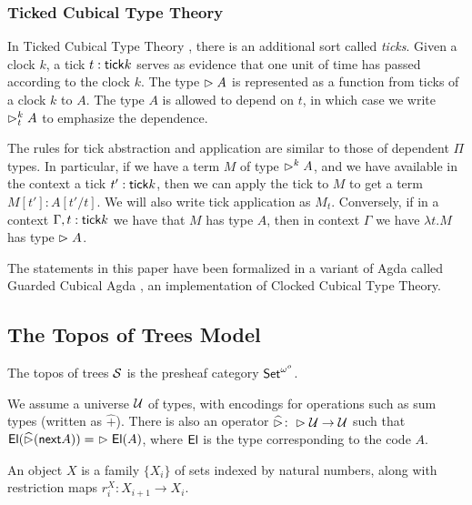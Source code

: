 \documentclass[acmsmall,screen]{acmart}
\begin{document}
\subsubsection{Ticked Cubical Type Theory}

In Ticked Cubical Type Theory \cite{TODO}, there is an additional sort
called \emph{ticks}. Given a clock $k$, a tick $t : \mathsf{tick} k$ serves
as evidence that one unit of time has passed according to the clock $k$.
The type $\vartriangleright A$ is represented as a function from ticks of a clock $k$ to $A$.
The type $A$ is allowed to depend on $t$, in which case we write $\vartriangleright^k_t A$
to emphasize the dependence.


The rules for tick abstraction and application are similar to those of dependent
$\Pi$ types. 
In particular, if we have a term $M$ of type $\vartriangleright^k A$, and we
have available in the context a tick $t' : \mathsf{tick} k$, then we can apply the tick to $M$ to get
a term $M[t'] : A[t'/t]$. We will also write tick application as $M_t$.
Conversely, if in a context $\Gamma, t : \mathsf{tick} k$ we have that $M$ has type $A$,
then in context $\Gamma$ we have $\lambda t.M$ has type $\vartriangleright A$. %

The statements in this paper have been formalized in a variant of Agda called
Guarded Cubical Agda \cite{TODO}, an implementation of Clocked Cubical Type Theory.




\subsection{The Topos of Trees Model}

The topos of trees $\mathcal{S}$ is the presheaf category $\mathsf{Set}^{\omega^o}$. 

  We assume a universe $\mathcal{U}$ of types, with encodings for operations such
  as sum types (written as $\widehat{+}$). There is also an operator 
  $\widehat{\vartriangleright} \colon \vartriangleright \mathcal{U} \to \mathcal{U}$ such that 
  $\mathsf{El}(\widehat{\vartriangleright}(\mathsf{next} A)) =\,\, \vartriangleright \mathsf{El}(A)$, where $\mathsf{El}$ is the type corresponding
  to the code $A$.

  An object $X$ is a family $\{X_i\}$ of sets indexed by natural numbers,
  along with restriction maps $r^X_i \colon X_{i+1} \to X_i$.
  
\end{document}
